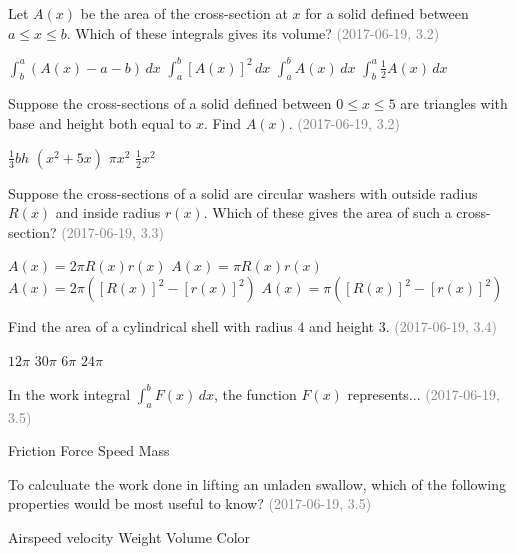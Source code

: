 \documentclass[12pt]{exam}
\newcommand{\questionDate}[1]{\textcolor{gray}{(#1)}}
\newcommand{\<}{\langle}
\renewcommand{\>}{\rangle}
\begin{document}
\begin{questions}
  \newpage

  \question
  Let \(A(x)\) be the area of the cross-section at \(x\) for
  a solid defined between
  \(a\leq x\leq b\). Which of these integrals gives its volume?
  \questionDate{2017-06-19, 3.2}
  \begin{choices}
    \choice
      \(\int_b^a (A(x)-a-b)\,dx\)
    \choice
      \(\int_a^b [A(x)]^2\,dx\)
    \CorrectChoice
      \(\int_a^b A(x)\,dx\)
    \choice
      \(\int_b^a \frac{1}{2}A(x)\,dx\)
  \end{choices}

  \question
  Suppose the cross-sections of a solid defined between \(0\leq x\leq 5\)
  are triangles with base and height both equal to \(x\).
  Find \(A(x)\).
  \questionDate{2017-06-19, 3.2}
  \begin{choices}
    \choice
      \(\frac{1}{3}bh\)
    \choice
      \((x^2+5x)\)
    \choice
      \(\pi x^2\)
    \CorrectChoice
      \(\frac{1}{2}x^2\)
  \end{choices}

  \question
  Suppose the cross-sections of a solid
  are circular washers with outside radius \(R(x)\) and inside radius \(r(x)\).
  Which of these gives the area of such a cross-section?
  \questionDate{2017-06-19, 3.3}
  \begin{choices}
    \choice
      \(A(x)=2\pi R(x)r(x)\)
    \choice
      \(A(x)=\pi R(x)r(x)\)
    \choice
      \(A(x)=2\pi ([R(x)]^2-[r(x)]^2)\)
    \CorrectChoice
      \(A(x)=\pi ([R(x)]^2-[r(x)]^2)\)
  \end{choices}

  \question
  Find the area of a cylindrical shell with radius \(4\) and height \(3\).
  \questionDate{2017-06-19, 3.4}
  \begin{choices}
    \choice
      \(12\pi\)
    \choice
      \(30\pi\)
    \choice
      \(6\pi\)
    \CorrectChoice
      \(24\pi\)
  \end{choices}

  \newpage

  \question
  In the work integral \(\int_a^b F(x)\,dx\), the function \(F(x)\)
  represents...
  \questionDate{2017-06-19, 3.5}
  \begin{choices}
    \choice
      Friction
    \CorrectChoice
      Force
    \choice
      Speed
    \choice
      Mass
  \end{choices}

  \question
  To calculuate the work done in lifting an unladen swallow,
  which of the following
  properties would be most useful to know?
  \questionDate{2017-06-19, 3.5}
  \begin{choices}
    \choice
      Airspeed velocity
    \CorrectChoice
      Weight
    \choice
      Volume
    \choice
      Color
  \end{choices}


\end{questions}
\end{document}
